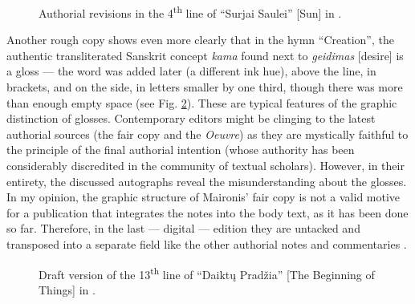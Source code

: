 \begin{paper}
\begin{figure}[H]
    \centering
    \caption{Authorial revisions in the 4\textsuperscript{th} line of ``Surjai Saulei'' {[}Sun{]} in \citealt[9v]{maironis_daiktu_1922}.}
    \label{fig:subacius5}
\end{figure}

Another rough copy shows even more clearly that in the hymn
``Creation'', the authentic transliterated Sanskrit concept \emph{kama}
found next to \emph{geidimas} {[}desire{]} is a gloss –– the word was
added later (a different ink hue), above the line, in brackets, and
on the side, in letters smaller by one third, though there was more than
enough empty space (see Fig. \ref{fig:subacius6}). These are typical features of the
graphic distinction of glosses. Contemporary editors might be clinging
to the latest authorial sources (the fair copy and the \emph{Oeuvre}) as
they are mystically faithful to the principle of the final authorial
intention (whose authority has been considerably discredited in the
community of textual scholars). However, in their entirety, the
discussed autographs reveal the misunderstanding about the glosses. In
my opinion, the graphic structure of Maironis' fair copy is not a valid
motive for a publication that integrates the notes into the body text, as it has been done so far.
Therefore, in the last –– digital –– edition they are untacked and
transposed into a separate field like the other authorial notes and
commentaries \citep{maironis_pavasario_2020}.

\begin{figure}[H]
    \centering
    \caption{Draft version of the 13\textsuperscript{th} line of ``Daiktų Pradžia'' {[}The Beginning of Things{]} in \citealt[6v]{maironis_daiktu_1922}.}
    \label{fig:subacius6}
\end{figure}


\end{paper}
